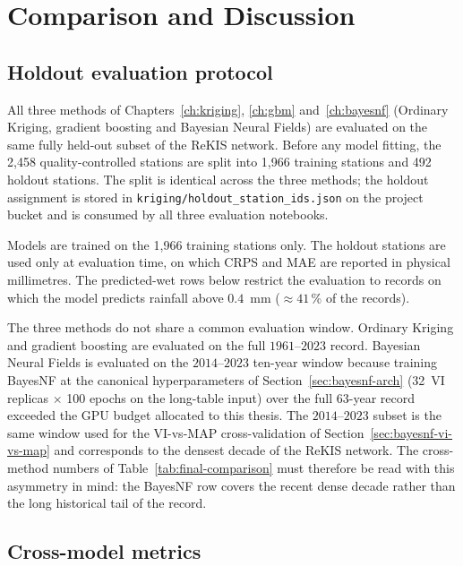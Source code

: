 \chapter{Comparison and Discussion}
\label{ch:comparison}

\section{Holdout evaluation protocol}
\label{sec:comparison-protocol}

All three methods of Chapters~\ref{ch:kriging}, \ref{ch:gbm}
and~\ref{ch:bayesnf} (Ordinary Kriging, gradient boosting and Bayesian
Neural Fields) are evaluated on the same fully held-out subset of the
ReKIS network. Before any model fitting, the 2{,}458 quality-controlled
stations are split into 1{,}966 training stations and 492 holdout
stations. The split is identical across the three methods; the holdout
assignment is stored in \texttt{kriging/holdout\_station\_ids.json} on the
project bucket and is consumed by all three evaluation notebooks.

Models are trained on the 1{,}966 training stations only. The holdout
stations are used only at evaluation time, on which CRPS and MAE are
reported in physical millimetres. The predicted-wet rows below restrict
the evaluation to records on which the model predicts rainfall above
$0{.}4$~mm (${\approx}41\,\%$ of the records).

The three methods do not share a common evaluation window. Ordinary
Kriging and gradient boosting are evaluated on the full $1961$--$2023$
record. Bayesian Neural Fields is evaluated on the $2014$--$2023$
ten-year window because training BayesNF at the canonical
hyperparameters of Section~\ref{sec:bayesnf-arch} (32~VI replicas
$\times$ 100 epochs on the long-table input) over the full $63$-year
record exceeded the GPU budget allocated to this thesis. The
$2014$--$2023$ subset is the same window used for the VI-vs-MAP
cross-validation of Section~\ref{sec:bayesnf-vi-vs-map} and corresponds
to the densest decade of the ReKIS network. The cross-method numbers
of Table~\ref{tab:final-comparison} must therefore be read with this
asymmetry in mind: the BayesNF row covers the recent dense decade
rather than the long historical tail of the record.

\section{Cross-model metrics}
\label{sec:comparison-metrics}


